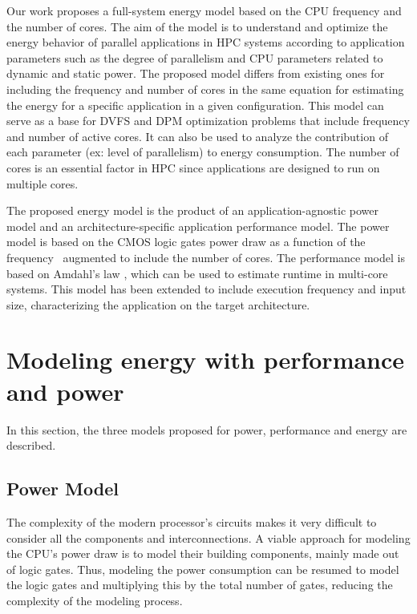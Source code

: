 \documentclass{ieeeaccess}
\begin{document}
Our work proposes a full-system energy model based on the CPU frequency and the number of cores.
The aim of the model is to understand and optimize the energy behavior of parallel applications in HPC systems according to application parameters such as the degree of parallelism and CPU parameters related to dynamic and static power. The proposed model differs from existing ones for including the frequency and number of cores in the same equation for estimating the energy for a specific application in a given configuration. This model can serve as a base for DVFS and DPM optimization problems that include frequency and number of active cores. It can also be used to analyze the contribution of each parameter (ex: level of parallelism) to energy consumption. The number of cores is an essential factor in HPC since applications are designed to run on multiple cores.

The proposed energy model is the product of an application-agnostic power model and an architecture-specific application performance model. The power model is based on the CMOS logic gates power draw as a function of the frequency~\cite{Sarwar1997, Butzen2007} augmented to include the number of cores. The performance model is based on Amdahl's law \cite{Amdahl1967ValidityCapabilities, Eyerman2010ModelingDesign, Shi2015ReevaluatingLaw}, which can be used to estimate runtime in multi-core systems. This model has been extended to include execution frequency and input size, characterizing the application on the target architecture.


\section{Modeling energy with performance and power} \label{sec:models}
In this section, the three models proposed for power, performance and energy are described.

\subsection{Power Model} \label{sec:powermodel}
The complexity of the modern processor's circuits makes it very difficult to consider all the components and interconnections. A viable approach for modeling the CPU's power draw is to model their building components, mainly made out of logic gates. Thus, modeling the power consumption can be resumed to model the logic gates and multiplying this by the total number of gates, reducing the complexity of the modeling process.
\end{document}
